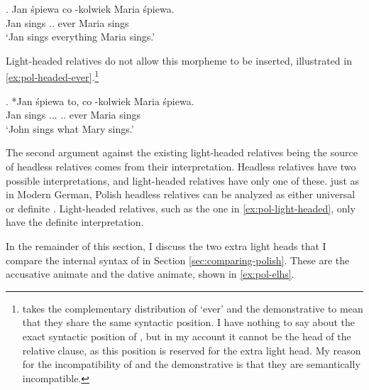 \exg. Jan śpiewa co -kolwiek Maria śpiewa.\\
Jan sings .. ever Maria sings\\
`Jan sings everything Maria sings.' \label{ex:pol-headless-ever}

Light-headed relatives do not allow this morpheme to be inserted, illustrated in \ref{ex:pol-headed-ever}.\footnote{
\citet{citko2004} takes the complementary distribution of  `ever' and the demonstrative to mean that they share the same syntactic position. I have nothing to say about the exact syntactic position of , but in my account it cannot be the head of the relative clause, as this position is reserved for the extra light head. My reason for the incompatibility of  and the demonstrative is that they are semantically incompatible.
}

\exg. *Jan śpiewa to, co -kolwiek Maria śpiewa.\\
Jan sings ... .. ever Maria sings\\
`John sings what Mary sings.' \label{ex:pol-headed-ever}

The second argument against the existing light-headed relatives being the source of headless relatives comes from their interpretation. Headless relatives have two possible interpretations, and light-headed relatives have only one of these.
just as in Modern German, Polish headless relatives can be analyzed as either universal or definite .
Light-headed relatives, such as the one in \ref{ex:pol-light-headed}, only have the definite interpretation.

In the remainder of this section, I discuss the two extra light heads that I compare the internal syntax of in Section \ref{sec:comparing-polish}. These are the accusative animate and the dative animate, shown in \ref{ex:pol-elhs}.

